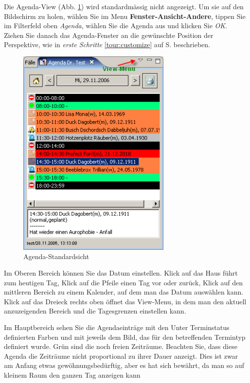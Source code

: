 Die Agenda-View (Abb. \ref{fig:agenda1}) wird standardmässig nicht angezeigt. Um sie auf den Bildschirm zu holen, wählen Sie im Menu
 \textbf{Fenster-Ansicht-Andere}, tippen Sie im Filterfeld oben \textit{Agenda}, wählen Sie die Agenda aus und
 klicken Sie \textit{OK}. Ziehen Sie danach das Agenda-Fenster an die gewünschte Position der Perspektive, wie in \textit{erste Schritte} \ref{tour:customize} auf S. \pageref{tour:customize} beschrieben.
\begin{figure}
\includegraphics[width=3in]{images/use2.png}
\caption{Agenda-Standardsicht}\label{fig:agenda1}
\end{figure}
Im Oberen Bereich können Sie das Datum einstellen. Klick auf das Haus führt zum heutigen Tag, Klick auf die Pfeile einen Tag vor oder
zurück, Klick auf den mittleren Bereich zu einem Kalender, auf dem man das Datum auswählen kann.
Klick auf das Dreieck rechts oben öffnet das View-Menu, in dem man den aktuell anzuzeigenden Bereich und die Tagesgrenzen einstellen kann.

Im Hauptbereich sehen Sie die Agendaeinträge mit den Unter Terminstatus definierten Farben und mit jeweils dem Bild, das für den betreffenden Termintyp definiert wurde. Grün sind die noch freien  Zeiträume. Beachten Sie, dass diese Agenda die Zeiträume nicht proportional zu ihrer Dauer anzeigt. Dies ist zwar am Anfang etwas gewöhnungsbedürftig, aber es hat sich bewährt, da man so auf kleinem Raum den ganzen Tag anzeigen kann

\medskip

